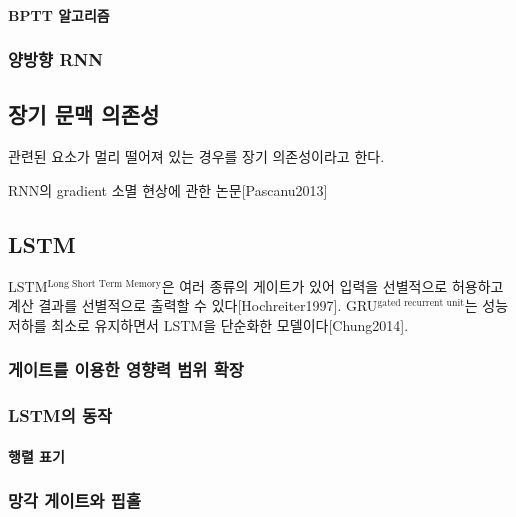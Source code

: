 \documentclass [12pt] {oblivoir}
\let\oldsubsubsection=\subsubsection
\renewcommand{\subsubsection}
{
  \filbreak
  \oldsubsubsection
}
\begin{document}
\vspace{3mm}

\paragraph*{BPTT 알고리즘}\mbox{}

\vspace{3mm}

\subsubsection{양방향 RNN}

\subsection{장기 문맥 의존성}

관련된 요소가 멀리 떨어져 있는 경우를 장기 의존성이라고 한다.

RNN의 gradient 소멸 현상에 관한 논문[Pascanu2013]

\subsection{LSTM}

LSTM$^{\text{Long Short Term Memory}}$은 여러 종류의 게이트가 있어 입력을 선별적으로 허용하고 계산 결과를 선별적으로 출력할 수 있다[Hochreiter1997].
GRU$^{\text{gated recurrent unit}}$는 성능 저하를 최소로 유지하면서 LSTM을 단순화한 모델이다[Chung2014].

\subsubsection{게이트를 이용한 영향력 범위 확장}

\subsubsection{LSTM의 동작}

\paragraph*{행렬 표기}\mbox{}

\vspace{3mm}

\subsubsection{망각 게이트와 핍홀}
\end{document}
